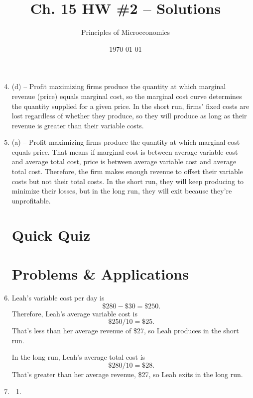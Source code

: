 \documentclass{article}
\title{Ch. 15 HW \#2 -- Solutions}
\author{Principles of Microeconomics}
\date{\today}
\begin{document}
\maketitle

\begin{enumerate}

\setcounter{enumi}{3}
\item (d) -- Profit maximizing firms produce the quantity at which marginal revenue (price) equals marginal cost, so the marginal cost curve determines the quantity supplied for a given price. In the short run, firms' fixed costs are lost regardless of whether they produce, so they will produce as long as their revenue is greater than their variable costs. 

\item (a) -- Profit maximizing firms produce the quantity at which marginal cost equals price. That means if marginal cost is between average variable cost and average total cost, price is between average variable cost and average total cost. Therefore, the firm makes enough revenue to offset their variable costs but not their total costs. In the short run, they will keep producing to minimize their losses, but in the long run, they will exit because they're unprofitable.

\section*{Quick Quiz}

\section*{Problems \& Applications}

\setcounter{enumi}{1}
\item Leah's variable cost per day is \[\$280 - \$30 = \$250.\] Therefore, Leah's average variable cost is \[\$250 / 10 = \$25.\] That's less than her average revenue of \$27, so Leah produces in the short run.

In the long run, Leah's average total cost is \[\$280 / 10 = \$28.\] That's greater than her average revenue, \$27, so Leah exits in the long run.

\setcounter{enumi}{3}
\item

	\begin{enumerate}
	
	\item \phantom{x}
	

\end{enumerate}
\end{enumerate}
\end{document}
